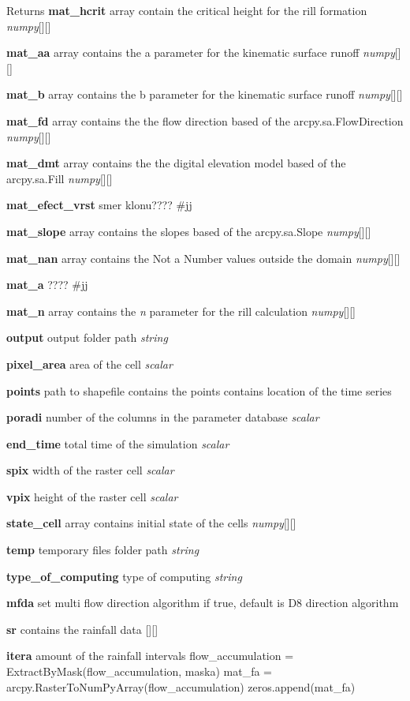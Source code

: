 \begin{DoxyReturn}{Returns}
{\bfseries mat\-\_\-hcrit} array contain the critical height for the rill formation {\itshape numpy}\mbox{[}\mbox{]}\mbox{[}\mbox{]} 

{\bfseries mat\-\_\-aa} array contains the a parameter for the kinematic surface runoff {\itshape numpy}\mbox{[}\mbox{]}\mbox{[}\mbox{]} 

{\bfseries mat\-\_\-b} array contains the b parameter for the kinematic surface runoff {\itshape numpy}\mbox{[}\mbox{]}\mbox{[}\mbox{]} 

{\bfseries mat\-\_\-fd} array contains the the flow direction based of the arcpy.\-sa.\-Flow\-Direction {\itshape numpy}\mbox{[}\mbox{]}\mbox{[}\mbox{]} 

{\bfseries mat\-\_\-dmt} array contains the the digital elevation model based of the arcpy.\-sa.\-Fill {\itshape numpy}\mbox{[}\mbox{]}\mbox{[}\mbox{]} 

{\bfseries mat\-\_\-efect\-\_\-vrst} smer klonu???? \#jj 

{\bfseries mat\-\_\-slope} array contains the slopes based of the arcpy.\-sa.\-Slope {\itshape numpy}\mbox{[}\mbox{]}\mbox{[}\mbox{]} 

{\bfseries mat\-\_\-nan} array contains the Not a Number values outside the domain {\itshape numpy}\mbox{[}\mbox{]}\mbox{[}\mbox{]} 

{\bfseries mat\-\_\-a} ???? \#jj 

{\bfseries mat\-\_\-n} array contains the {\itshape n} parameter for the rill calculation {\itshape numpy}\mbox{[}\mbox{]}\mbox{[}\mbox{]} 

{\bfseries output} output folder path {\itshape string} 

{\bfseries pixel\-\_\-area} area of the cell {\itshape scalar} 

{\bfseries points} path to shapefile contains the points contains location of the time series 

{\bfseries poradi} number of the columns in the parameter database {\itshape scalar} 

{\bfseries end\-\_\-time} total time of the simulation {\itshape scalar} 

{\bfseries spix} width of the raster cell {\itshape scalar} 

{\bfseries vpix} height of the raster cell {\itshape scalar} 

{\bfseries state\-\_\-cell} array contains initial state of the cells {\itshape numpy}\mbox{[}\mbox{]}\mbox{[}\mbox{]} 

{\bfseries temp} temporary files folder path {\itshape string} 

{\bfseries type\-\_\-of\-\_\-computing} type of computing {\itshape string} 

{\bfseries mfda} set multi flow direction algorithm if true, default is D8 direction algorithm 

{\bfseries sr} contains the rainfall data \mbox{[}\mbox{]}\mbox{[}\mbox{]} 

{\bfseries itera} amount of the rainfall intervals flow\-\_\-accumulation = Extract\-By\-Mask(flow\-\_\-accumulation, maska) mat\-\_\-fa = arcpy.\-Raster\-To\-Num\-Py\-Array(flow\-\_\-accumulation) zeros.\-append(mat\-\_\-fa) 
\end{DoxyReturn}
